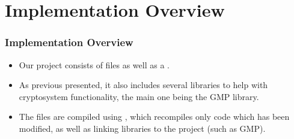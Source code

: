\section{Implementation Overview}



\begin{frame}
\frametitle{Implementation Overview}
\begin{itemize}
\item Our project consists of  files as well
  as a .
\item As previous presented, it also includes several
  libraries to help with cryptosystem functionality, the
  main one being the GMP library.
\item The  files are compiled using
  , which recompiles only code which has been
  modified, as well as linking libraries to the project
  (such as GMP).
\end{itemize}
\end{frame}
